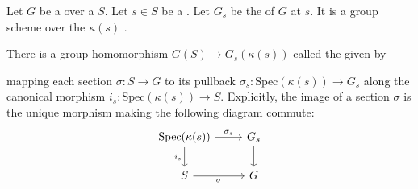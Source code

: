 \begin{definition} \label{definition:reduction_map_for_group_scheme_over_a_scheme_at_a_ponit}
    Let $G$ be a  over a  $S$. Let $s \in S$ be a . Let $G_s$ be the  of $G$ at $s$. It is a group scheme over the  $\kappa(s)$ .

    There is a group homomorphism $G(S) \to G_s(\kappa(s))$ called the  given by 

    mapping each section $\sigma: S \to G$ to its pullback $\sigma_s: \text{Spec}(\kappa(s)) \to G_s$ along the canonical morphism $i_s: \text{Spec}(\kappa(s)) \to S$. Explicitly, the image of a section $\sigma$ is the unique morphism making the following diagram commute:
    \[
    \begin{tikzcd}
    \text{Spec}(\kappa(s)) \arrow[r, "\sigma_s"] \arrow[d, "i_s"'] & G_s \arrow[d] \\
    S \arrow[r, "\sigma"'] & G
    \end{tikzcd}
    \]
\end{definition}